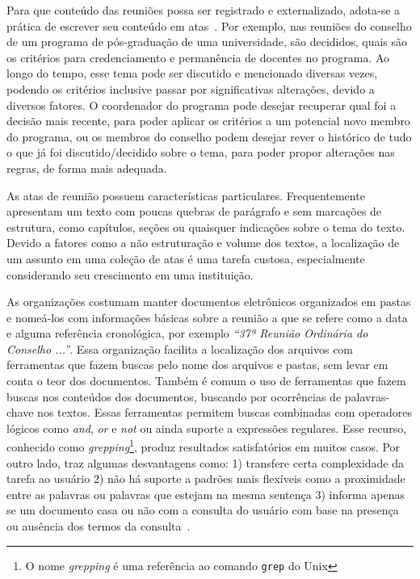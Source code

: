 Para que conteúdo das reuniões possa ser registrado e externalizado, adota-se a prática de escrever seu conteúdo em atas~\cite{Miriam2013, Lee2011}. Por exemplo, nas reuniões do conselho de um programa de pós-graduação de uma universidade, são decididos, quais são os critérios para credenciamento e permanência de docentes no programa. Ao longo do tempo, esse tema pode ser discutido e mencionado diversas vezes, podendo os critérios inclusive passar por significativas alterações, devido a diversos fatores. O coordenador do programa pode desejar recuperar qual foi a decisão mais recente, para poder aplicar os critérios a um potencial novo membro do programa, ou os membros do conselho podem desejar rever o histórico de tudo o que já foi discutido/decidido sobre o tema, para poder propor alterações nas regras, de forma mais adequada.

As atas de reunião possuem características particulares. Frequentemente apresentam um texto com poucas quebras de parágrafo e sem marcações de estrutura, como capítulos, seções ou quaisquer indicações sobre o tema do texto. Devido a fatores como a não estruturação e volume dos textos, a localização de um assunto em uma coleção de atas é uma tarefa custosa, especialmente considerando seu crescimento em uma instituição. 


As organizações costumam manter documentos eletrônicos organizados em pastas e nomeá-los com informações básicas sobre a reunião a que se refere como a data e alguma referência cronológica, por exemplo \textit{``37ª Reunião Ordinária do Conselho ...''}. Essa organização facilita a localização dos arquivos com ferramentas que fazem buscas pelo nome dos arquivos e pastas, sem levar em conta o teor dos documentos. 
%
Também é comum o uso de ferramentas que fazem buscas nos conteúdos dos documentos, buscando por ocorrências de palavras-chave nos textos. Essas ferramentas permitem buscas combinadas com operadores lógicos como \textit{and}, \textit{or} e \textit{not} ou ainda suporte a expressões regulares. Esse recurso, conhecido como \textit{grepping}\footnote{O nome \textit{grepping} é uma referência ao comando \texttt{grep} do Unix}, produz resultados satisfatórios em muitos casos. Por outro lado, traz algumas desvantagens como: 
1) transfere certa complexidade da tarefa ao usuário 
2) não há suporte a padrões mais flexíveis como a proximidade entre as palavras ou palavras que estejam na mesma sentença 
3) informa apenas se um documento casa ou não com a consulta do usuário com base na presença ou ausência dos termos da consulta~\cite{Aggarwal2012,Manning2008}. 
 

